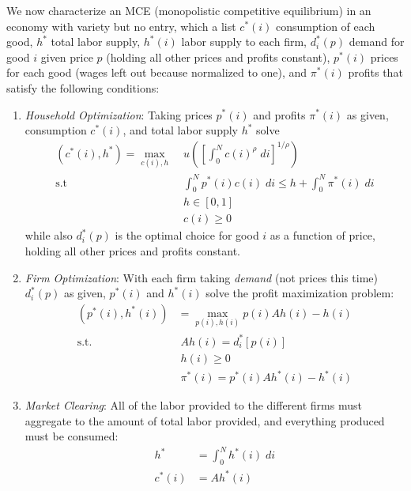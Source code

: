 \documentclass[12pt]{article}
\theoremstyle{plain}
\theoremstyle{definition}
\theoremstyle{remark}
\newcommand{\intzN}{\int_0^N}
\begin{document}
We now characterize an MCE (monopolistic competitive equilibrium) in an
economy with variety but no entry, which a list $c^*(i)$ consumption of
each good, $h^*$ total labor supply, $h^*(i)$ labor supply to each firm,
$d^*_i(p)$ demand for good $i$ given price $p$ (holding all other prices
and profits constant), $p^*(i)$ prices for each good (wages left out
because normalized to one), and $\pi^*(i)$ profits that satisfy the
following conditions:
\begin{enumerate}
  \item \emph{Household Optimization}: Taking prices $p^*(i)$ and
    profits $\pi^*(i)$ as given, consumption $c^*(i)$, and total labor
    supply $h^*$ solve
    \begin{align*}
      (c^*(i), h^*)
      = \max_{c(i), h}
        & \; u\left(
          \left[ \int_0^N c(i)^\rho \; di \right]^{1/\rho}
        \right)\\
      \text{s.t} & \;
        \intzN p^*(i) c(i) \; di \leq h
          + \intzN \pi^*(i) \; di \\
      &\; h\in[0,1] \\
      &\; c(i) \geq 0
    \end{align*}
    while also $d^*_i(p)$ is the optimal choice for good $i$ as a
    function of price, holding all other prices and profits constant.

  \item \emph{Firm Optimization}: With each firm taking \emph{demand}
    (not prices this time) $d_i^*(p)$ as given, $p^*(i)$ and $h^*(i)$
    solve the profit maximization problem:
    \begin{align*}
      (p^*(i),h^*(i))
      &=
      \max_{p(i),h(i)}
      p(i) Ah(i) - h(i) \\
      \text{s.t.} \;
      & \; Ah(i) = d_i^*[p(i)] \\
      & \; h(i) \geq 0\\
      & \; \pi^*(i) = p^*(i) Ah^*(i) - h^*(i)
    \end{align*}

  \item \emph{Market Clearing}: All of the labor provided to the
    different firms must aggregate to the amount of total labor
    provided, and everything produced must be consumed:
    \begin{align*}
       h^* &= \intzN h^*(i) \; di \\
       c^*(i) &= Ah^*(i)
    \end{align*}
\end{enumerate}
\end{document}
